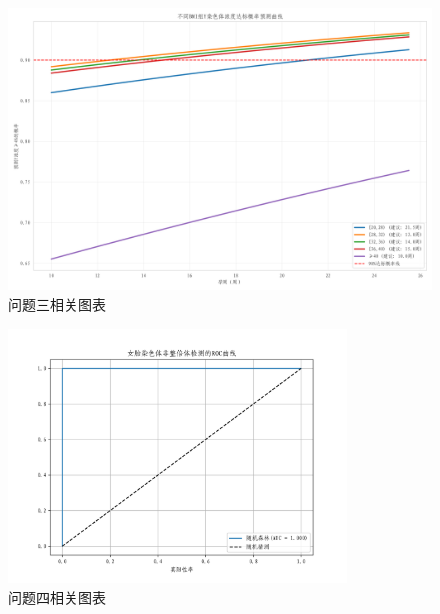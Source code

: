 \documentclass[withoutpreface,bwprint]{cumcmthesis} %
\begin{document}
\begin{appendices}
\begin{figure}[H]
\begin{minipage}{0.49\textwidth}
        \end{minipage}
        \begin{minipage}{0.49\textwidth}
            \centering
            \includegraphics[width=\textwidth]{../figure/C3_Output/predicted_attainment_curve.png}
        \end{minipage}
        \caption{问题三相关图表}
        \label{fig:q3}
    \end{figure}

     \begin{figure}[H]
        \centering
        \includegraphics[width=0.8\textwidth]{../figure/C4_Output/roc_curve_for_female_fetal_aneuploidy_detection.png}
        \caption{问题四相关图表}
        \label{fig:q4}
    \end{figure}




\end{appendices}
\end{document}
